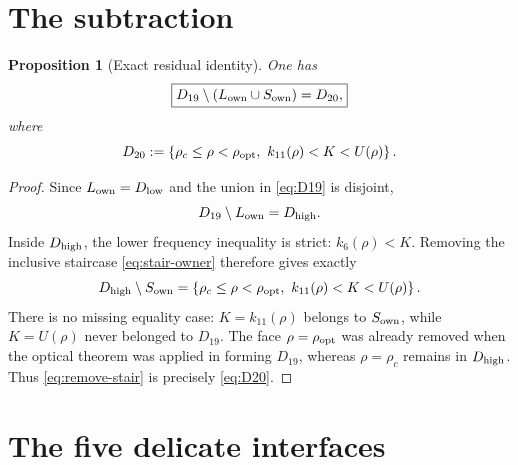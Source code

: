 \documentclass[11pt]{article}
\newtheorem{proposition}[lemma]{Proposition}
\begin{document}
\section{The subtraction}

\begin{proposition}[Exact residual identity]
\label{prop:D20}
One has
\begin{equation}
 \boxed{
 D_{19}\setminus
 (L_{\rm own}\cup S_{\rm own})
 =D_{20},}
 \label{eq:D20-identity}
\end{equation}
where
\begin{equation}
 D_{20}:=
 \left\{\rho_c\leq\rho<\rho_{\rm opt},
          \ k_{11}(\rho)<K<U(\rho)\right\}.
 \label{eq:D20}
\end{equation}
\end{proposition}

\begin{proof}
Since \(L_{\rm own}=D_{\rm low}\) and the union in
\eqref{eq:D19} is disjoint,
\begin{equation}
 D_{19}\setminus L_{\rm own}=D_{\rm high}.
 \label{eq:remove-low}
\end{equation}
Inside \(D_{\rm high}\), the lower frequency inequality is strict:
\(k_6(\rho)<K\). Removing the inclusive staircase
\eqref{eq:stair-owner} therefore gives exactly
\begin{equation}
 D_{\rm high}\setminus S_{\rm own}
 =\left\{\rho_c\leq\rho<\rho_{\rm opt},
          \ k_{11}(\rho)<K<U(\rho)\right\}.
 \label{eq:remove-stair}
\end{equation}
There is no missing equality case: \(K=k_{11}(\rho)\) belongs to
\(S_{\rm own}\), while \(K=U(\rho)\) never belonged to \(D_{19}\).
The face \(\rho=\rho_{\rm opt}\) was already removed when the optical
theorem was applied in forming \(D_{19}\), whereas \(\rho=\rho_c\)
remains in \(D_{\rm high}\).  Thus \eqref{eq:remove-stair} is precisely
\eqref{eq:D20}.
\end{proof}

\section{The five delicate interfaces}
\end{document}
